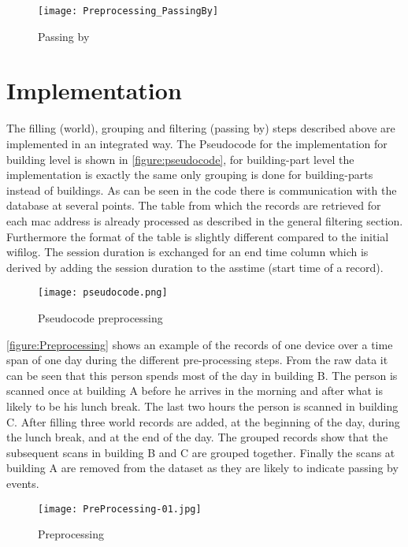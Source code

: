 \begin{figure}[H]
\centering
\texttt{[image: Preprocessing\_PassingBy]}
\captionsetup{justification=centering}
\caption{Passing by}
\label{figure:passing by}
\end{figure}

\section{Implementation}
The filling (world), grouping and filtering (passing by) steps described above are implemented in an integrated way. The Pseudocode for the implementation for building level is shown in \autoref{figure:pseudocode}, for building-part level the implementation is exactly the same only grouping is done for building-parts instead of buildings. As can be seen in the code there is communication with the database at several points. The table from which the records are retrieved for each mac address is already processed as described in the general filtering section. Furthermore the format of the table is slightly different compared to the initial wifilog. The session duration is exchanged for an end time column which is derived by adding the session duration to the asstime (start time of a record).

\begin{figure}[H]
\centering
\texttt{[image: pseudocode.png]}
\captionsetup{justification=centering}
\caption{Pseudocode preprocessing}
\label{figure:pseudocode}
\end{figure}

\autoref{figure:Preprocessing} shows an example of the records of one device over a time span of one day during the different pre-processing steps. From the raw data it can be seen that this person spends most of the day in building B. The person is scanned once at building A before he arrives in the morning and after what is likely to be his lunch break. The last two hours the person is scanned in building C. After filling three world records are added, at the beginning of the day, during the lunch break, and at the end of the day. The grouped records show that the subsequent scans in building B and C are grouped together. Finally the scans at building A are removed from the dataset as they are likely to indicate passing by events. 

\begin{figure}[H]
\centering
\texttt{[image: PreProcessing-01.jpg]}
\captionsetup{justification=centering}
\caption{Preprocessing}
\label{figure:Preprocessing}
\end{figure}


